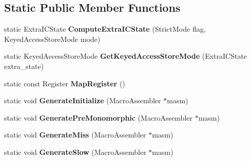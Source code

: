 \subsection*{Static Public Member Functions}
\begin{DoxyCompactItemize}
\item 
\hypertarget{classv8_1_1internal_1_1_keyed_store_i_c_a11551a79d3f1475290bda6f4daaa87a7}{}static Extra\+I\+C\+State {\bfseries Compute\+Extra\+I\+C\+State} (Strict\+Mode flag, Keyed\+Access\+Store\+Mode mode)\label{classv8_1_1internal_1_1_keyed_store_i_c_a11551a79d3f1475290bda6f4daaa87a7}

\item 
\hypertarget{classv8_1_1internal_1_1_keyed_store_i_c_a1230fc658892826ffb9523594b59fbf4}{}static Keyed\+Access\+Store\+Mode {\bfseries Get\+Keyed\+Access\+Store\+Mode} (Extra\+I\+C\+State extra\+\_\+state)\label{classv8_1_1internal_1_1_keyed_store_i_c_a1230fc658892826ffb9523594b59fbf4}

\item 
\hypertarget{classv8_1_1internal_1_1_keyed_store_i_c_abdc6558919748a3135442e2fa0ba7069}{}static const Register {\bfseries Map\+Register} ()\label{classv8_1_1internal_1_1_keyed_store_i_c_abdc6558919748a3135442e2fa0ba7069}

\item 
\hypertarget{classv8_1_1internal_1_1_keyed_store_i_c_af5d8e823439f6eeb50c8188d48b7aae9}{}static void {\bfseries Generate\+Initialize} (Macro\+Assembler $\ast$masm)\label{classv8_1_1internal_1_1_keyed_store_i_c_af5d8e823439f6eeb50c8188d48b7aae9}

\item 
\hypertarget{classv8_1_1internal_1_1_keyed_store_i_c_a5b5c8d91617d2cd035ccacd6398e9053}{}static void {\bfseries Generate\+Pre\+Monomorphic} (Macro\+Assembler $\ast$masm)\label{classv8_1_1internal_1_1_keyed_store_i_c_a5b5c8d91617d2cd035ccacd6398e9053}

\item 
\hypertarget{classv8_1_1internal_1_1_keyed_store_i_c_a22007a75a837a9f92c911cfefe8af694}{}static void {\bfseries Generate\+Miss} (Macro\+Assembler $\ast$masm)\label{classv8_1_1internal_1_1_keyed_store_i_c_a22007a75a837a9f92c911cfefe8af694}

\item 
\hypertarget{classv8_1_1internal_1_1_keyed_store_i_c_a5bf0a57d77dbb95409358f2a59f83f6e}{}static void {\bfseries Generate\+Slow} (Macro\+Assembler $\ast$masm)\label{classv8_1_1internal_1_1_keyed_store_i_c_a5bf0a57d77dbb95409358f2a59f83f6e}


\end{DoxyCompactItemize}
